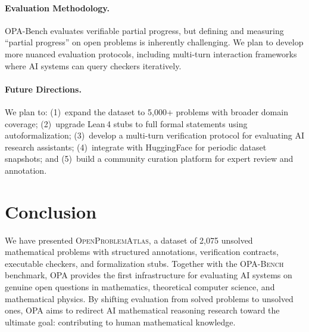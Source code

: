 \documentclass[11pt]{article}
\begin{document}
\paragraph{Evaluation Methodology.}
OPA-Bench evaluates verifiable partial progress, but defining and measuring ``partial progress'' on open problems is inherently challenging.
We plan to develop more nuanced evaluation protocols, including multi-turn interaction frameworks where AI systems can query checkers iteratively.

\paragraph{Future Directions.}
We plan to: (1)~expand the dataset to 5{,}000+ problems with broader domain coverage; (2)~upgrade Lean\,4 stubs to full formal statements using autoformalization; (3)~develop a multi-turn verification protocol for evaluating AI research assistants; (4)~integrate with HuggingFace for periodic dataset snapshots; and (5)~build a community curation platform for expert review and annotation.

\section{Conclusion}
\label{sec:conclusion}

We have presented \textsc{OpenProblemAtlas}, a dataset of 2{,}075 unsolved mathematical problems with structured annotations, verification contracts, executable checkers, and formalization stubs.
Together with the \textsc{OPA-Bench} benchmark, OPA provides the first infrastructure for evaluating AI systems on genuine open questions in mathematics, theoretical computer science, and mathematical physics.
By shifting evaluation from solved problems to unsolved ones, OPA aims to redirect AI mathematical reasoning research toward the ultimate goal: contributing to human mathematical knowledge.



\end{document}

